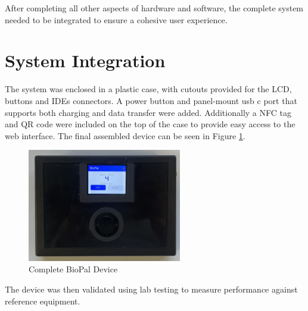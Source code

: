 After completing all other aspects of hardware and software, the complete system needed to be integrated to ensure a cohesive user experience.
\section{System Integration}
The system was enclosed in a plastic case, with cutouts provided for the LCD, buttons and \acp{IDE} connectors. A power button and panel-mount usb c port that supports both charging and data transfer were added. Additionally a \ac{NFC} tag and QR code were included on the top of the case to provide easy access to the web interface. The final assembled device can be seen in Figure \ref{fig:final_device}.

\begin{figure}[H]
    \centering
    \includegraphics[width=0.6\textwidth]{IntegratedSystem.jpg}
    \caption{Complete BioPal Device}
    \label{fig:final_device}
\end{figure}

The device was then validated using lab testing to measure performance against reference equipment.